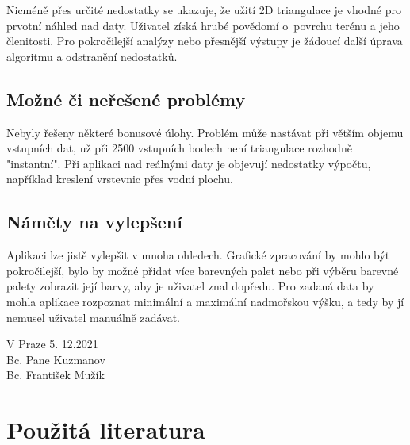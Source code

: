 \documentclass[a4paper, 12pt, oneside, titlepage]{article} %
\begin{document}
Nicméně přes určité nedostatky se ukazuje, že užití 2D triangulace je vhodné pro prvotní náhled nad daty. Uživatel získá hrubé povědomí o~povrchu terénu a jeho členitosti. Pro pokročilejší analýzy nebo přesnější výstupy je žádoucí další úprava algoritmu a odstranění nedostatků.

\subsection{Možné či neřešené problémy} \label{mcn_problemy}
Nebyly řešeny některé bonusové úlohy. Problém může nastávat při větším objemu vstupních dat, už při 2500 vstupních bodech není triangulace rozhodně "instantní". 
Při aplikaci nad reálnými daty je objevují nedostatky výpočtu, například kreslení vrstevnic přes vodní plochu.

\subsection{Náměty na vylepšení} \label{vylepseni}
Aplikaci lze jistě vylepšit v mnoha ohledech. Grafické zpracování by mohlo být pokročilejší, bylo by možné přidat více barevných palet nebo při výběru barevné palety zobrazit její barvy, aby je uživatel znal dopředu. 
Pro zadaná data by mohla aplikace rozpoznat minimální a maximální nadmořskou výšku, a tedy by jí nemusel uživatel manuálně zadávat.




\begin{flushright}
V Praze 5. 12.2021\\
\vspace{2mm}
Bc. Pane Kuzmanov\\
Bc. František Mužík\\
\end{flushright}


\clearpage 
\section*{Použitá literatura}
\renewcommand{\section}[2]{}%


\end{document}

